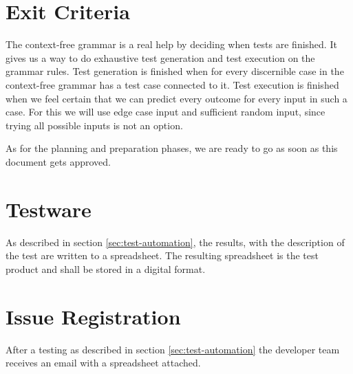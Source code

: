 \documentclass[11pt,a4paper]{article}
\begin{document}

\section{Exit Criteria}

The context-free grammar is a real help by deciding when tests are
finished. It gives us a way to do exhaustive test generation and test
execution on the grammar rules. Test generation is finished when for every discernible case
in the context-free grammar has a test case connected to it. Test
execution is finished when we feel certain that we can predict every
outcome for every input in such a case. For this we will use edge case input and sufficient random input, since trying all possible inputs is not an option.


As for the planning and preparation phases, we are ready to go as soon as this document gets approved.


\section{Testware}

As described in section \ref{sec:test-automation}, the results, with
the description of the test are written to a spreadsheet. The
resulting spreadsheet is the test product and shall be stored in a
digital format.


\section{Issue Registration}
After a testing as described in section \ref{sec:test-automation} the
developer team receives an email with a spreadsheet attached.
\end{document}
